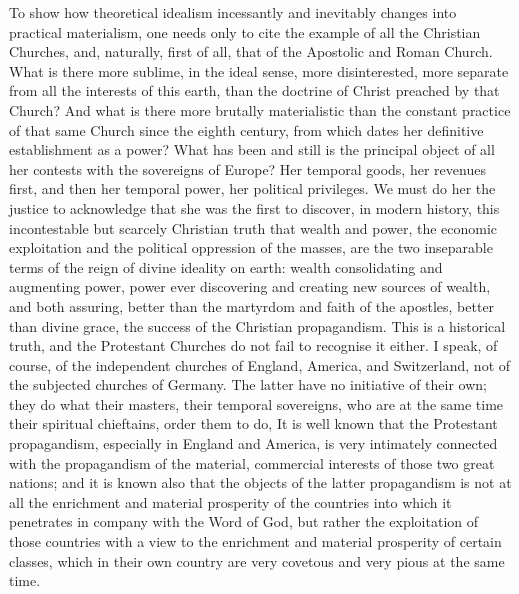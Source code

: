 \documentclass[12pt]{report}
\begin{document}
To show how theoretical idealism incessantly and inevitably changes into practical materialism, one needs only to cite the example of all the Christian Churches, and, naturally, first of all, that of the Apostolic and Roman Church. What is there more sublime, in the ideal sense, more disinterested, more separate from all the interests of this earth, than the doctrine of Christ preached by that Church? And what is there more brutally materialistic than the constant practice of that same Church since the eighth century, from which dates her definitive establishment as a power? What has been and still is the principal object of all her contests with the sovereigns of Europe? Her temporal goods, her revenues first, and then her temporal power, her political privileges. We must do her the justice to acknowledge that she was the first to discover, in modern history, this incontestable but scarcely Christian truth that wealth and power, the economic exploitation and the political oppression of the masses, are the two inseparable terms of the reign of divine ideality on earth: wealth consolidating and augmenting power, power ever discovering and creating new sources of wealth, and both assuring, better than the martyrdom and faith of the apostles, better than divine grace, the success of the Christian propagandism. This is a historical truth, and the Protestant Churches do not fail to recognise it either. I speak, of course, of the independent churches of England, America, and Switzerland, not of the subjected churches of Germany. The latter have no initiative of their own; they do what their masters, their temporal sovereigns, who are at the same time their spiritual chieftains, order them to do, It is well known that the Protestant propagandism, especially in England and America, is very intimately connected with the propagandism of the material, commercial interests of those two great nations; and it is known also that the objects of the latter propagandism is not at all the enrichment and material prosperity of the countries into which it penetrates in company with the Word of God, but rather the exploitation of those countries with a view to the enrichment and material prosperity of certain classes, which in their own country are very covetous and very pious at the same time.
\end{document}
